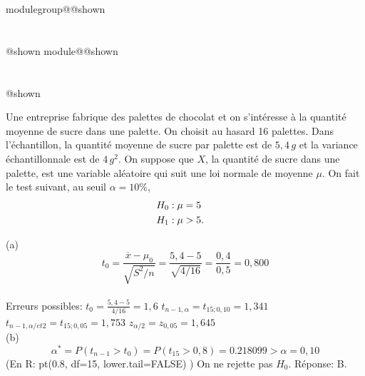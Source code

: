 \documentclass{Evaluation}
\makeatletter
\newcommand{\currentmodulekey}{}
\newcommand{\currentmoduletitle}{}
\newcommand{\currentgroupkey}{}
\newcommand{\currentgrouptitle}{}
\newcommand{\showmoduleifneeded}{%
  \ifx\currentgroupkey\empty\else
    \expandafter\ifx\csname modulegroup@\currentgroupkey @shown\endcsname\relax
      \section*{\currentgrouptitle}%
      \expandafter\gdef\csname modulegroup@\currentgroupkey @shown\endcsname{1}%
    \fi
  \fi
  \expandafter\ifx\csname module@\currentmodulekey @shown\endcsname\relax
    \section*{\currentmoduletitle}%
    \expandafter\gdef\csname module@\currentmodulekey @shown\endcsname{1}%
  \fi
}
\newenvironment{A22}{\showmoduleifneeded}{}
\makeatother
\begin{document}
\begin{questions}
\begin{A22}
Une entreprise fabrique des palettes de chocolat et on s'intéresse à la quantité moyenne de sucre dans une palette.  On choisit au hasard 16 palettes. Dans l'échantillon, la quantité moyenne de sucre par palette est de $5,4 \,g$ et la variance échantillonnale est de $4 \, g^2$. On suppose que $X$, la quantité de sucre dans une palette, est une variable aléatoire qui suit une loi normale de moyenne $\mu$. On fait le test suivant, au seuil $\alpha=10\%$,
\begin{align*}
	H_0 &: \mu = 5 \cr
	H_1 &: \mu > 5.
\end{align*}


	\begin{solution}
  (a) $$ t_0 = \frac{\overline{x}-\mu_0}{\sqrt{S^2/n}} = \frac{ 5,4- 5}{\sqrt{4/16}} = \frac{0,4}{0,5} = 0,800 $$ \\
  Erreurs possibles: 
  $ t_0 = \frac{ 5,4- 5}{{4/16}} = 1,6 $
  $ t_{n-1, \alpha} = t_{15; 0,10} = 1,341 $
  $ t_{n-1, \alpha/et 2} = t_{15; 0,05} = 1,753 $
  $ z_{\alpha/2} = z_{0,05} = 1,645$
  \\
 (b) $$ \alpha^* =  P( t_{n-1} > t_0 ) = P( t_{15} > 0,8 ) =  0.218099  > \alpha = 0,10$$
		(En R: pt(0.8, df=15, lower.tail=FALSE) )
		On ne rejette pas $H_0$. Réponse: 	B.
	\end{solution}


\end{A22}
\end{questions}
\end{document}
